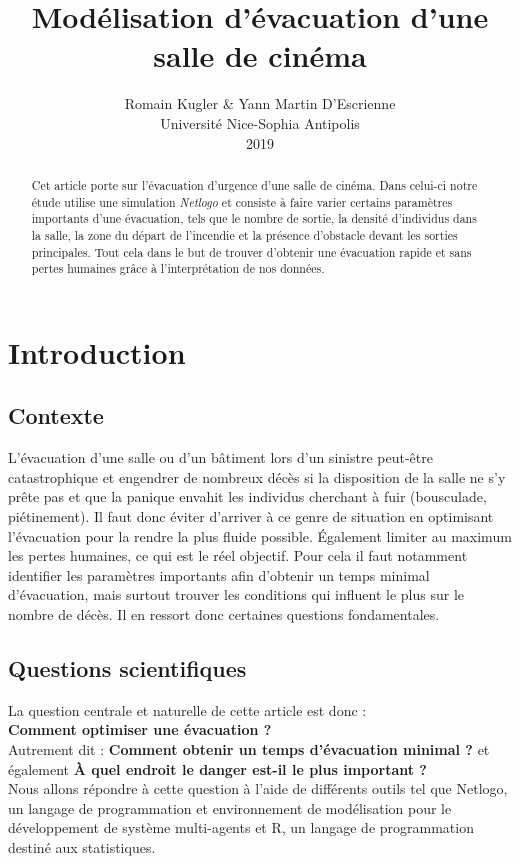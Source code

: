 \documentclass{article}
\begin{document}
\title{Modélisation d'évacuation d'une salle de cinéma}
\author{
Romain Kugler \& Yann Martin D'Escrienne\\
Université Nice-Sophia Antipolis\\
2019}

\maketitle

\begin{abstract}
Cet article porte sur l’évacuation d’urgence d’une salle de cinéma. Dans celui-ci notre étude utilise une simulation {\it Netlogo} et consiste à faire varier certains paramètres importants d’une évacuation, tels que le nombre de sortie, la densité d’individus dans la salle, la zone du départ de l’incendie et la présence d’obstacle devant les sorties principales. Tout cela dans le but de trouver d'obtenir une évacuation rapide et sans pertes humaines grâce à l'interprétation de nos données. 

\end{abstract}

\section{Introduction}
\subsection{Contexte}
L’évacuation d’une salle ou d’un bâtiment lors d’un sinistre peut-être catastrophique et engendrer de nombreux décès si la disposition de la salle ne s’y prête pas et que la panique envahit les individus cherchant à fuir (bousculade, piétinement). Il faut donc éviter d’arriver à ce genre de situation en optimisant l’évacuation pour la rendre la plus fluide possible. Également limiter au maximum les pertes humaines, ce qui est le réel objectif.  
Pour cela il faut notamment identifier les paramètres importants afin d’obtenir un temps minimal d’évacuation, mais surtout trouver les conditions qui influent le plus sur le nombre de décès. 
Il en ressort donc certaines questions fondamentales. 

\subsection{Questions scientifiques}
La question centrale et naturelle de cette article est donc :\\
{\bf Comment optimiser une évacuation ?}\\
Autrement dit : {\bf Comment obtenir un temps d'évacuation minimal ?}
et également {\bf À quel endroit le danger est-il le plus important ?}\\
Nous allons répondre à cette question à l’aide de différents outils tel que Netlogo, un langage de programmation et environnement de modélisation pour le développement de système multi-agents et R, un langage de programmation destiné aux statistiques.
\end{document}
